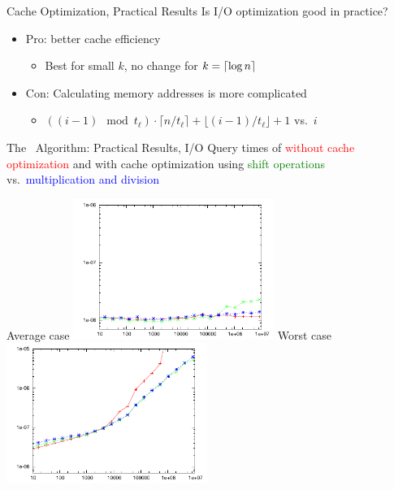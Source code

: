 \documentclass{beamer}
\begin{document}
\begin{frame}{Cache Optimization, Practical Results}
    Is I/O optimization good in practice?
    \begin{itemize}
        \item Pro: better cache efficiency
            \begin{itemize}
                \item Best for small $k$, no change for $k=\lceil\log n\rceil$
            \end{itemize}
        \item Con: Calculating memory addresses is more complicated
            \begin{itemize}
                \item $((i-1)\mod t_\ell)\cdot\lceil n/t_\ell\rceil+\lfloor (i-1)/t_\ell\rfloor+1$ vs.\ $i$
            \end{itemize}
    \end{itemize}
\end{frame}

\begin{frame}{The \fprintk\ Algorithm: Practical Results, I/O}
    Query times of \fprint[2]
    \textcolor{red}{without cache optimization}
    and with cache optimization using
    \textcolor{green}{shift operations} vs.\
    \textcolor{blue}{multiplication and division}
    \begin{multicols}{2}{
        \begin{center}
            Average case
            \includegraphics[width=0.49\textwidth,type=pdf,ext=.pdf,read=.pdf]{../src/results/length-slides-cache-fp2-rand10.plt}
            \newpage
            Worst case
            \includegraphics[width=0.49\textwidth,type=pdf,ext=.pdf,read=.pdf]{../src/results/length-slides-cache-fp2-alla.plt}
        \end{center}
    }
    \end{multicols}
\end{frame}
\end{document}
